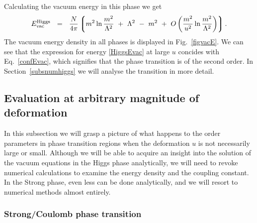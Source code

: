 \documentclass[epsfig,12pt]{article}
\def\beq{\begin{equation}}
\def\eeq{\end{equation}}
\def\beq{\begin{equation}}
\def\eeq{\end{equation}}
\newcommand{\lgr}{\left\lgroup}
\newcommand{\rgr}{\right\rgroup}
\begin{document}
{Calculating the vacuum energy in this phase we get
\beq
E_{\rm vac}^{\rm Higgs} ~~=~~ \frac{N}{4\pi}\lgr m^2\ln {\frac{m^2}{\Lambda^2}} ~+~ \Lambda^2 ~-~ m^2 
                                                         ~+~ O \left( \frac{m^2}{u^2} \ln \frac{m^2}{\Lambda^2} \right)
					\rgr.
\label{HiggsEvac}
\eeq
The vacuum energy density in all phases is displayed in Fig.~\ref{figvacE}. 
We can see that the expression for energy \eqref{HiggsEvac} at large $u$ concides with Eq.~\eqref{confEvac},
which signifies that the phase transition is of the second order.
In Section~\ref{subsnumhiggs} we will analyse the transition in more detail.

%
%
\subsection{Evaluation at arbitrary magnitude of deformation} 
\label{subsnum}

In this subsection we will grasp a picture of what happens to the order parameters in phase 
transition regions when the deformation $ u $ is not necessarily large or small.
Although we will be able to acquire an insight into the solution of the vacuum equations
in the Higgs phase analytically, we will need to revoke numerical calculations to 
examine the energy density and the coupling constant. 
In the Strong phase, even less can be done analytically, and we will resort to numerical
methods almost entirely. 

\subsubsection{Strong/Coulomb phase transition}

}
\end{document}
